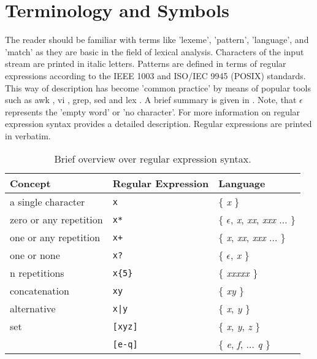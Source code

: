 \documentclass[acmtoplas]{acmtrans2m}
\begin{document}
\section{Terminology and Symbols}

The reader should be familiar with terms like 'lexeme', 'pattern', 'language',
    and 'match' as they are basic in the field of lexical analysis.  Characters
    of the input stream are printed in italic letters.  Patterns are defined in
    terms of regular expressions according to the IEEE 1003 and ISO/IEC 9945
    (POSIX) \cite{} standards.  This way of description has become 'common
    practice' by means of popular tools such as awk \cite{Aho:1988}, vi
    \cite{Lamb:1998}, grep, sed \cite{Dougherty:1997} and lex \cite{Lesk:1975}.
    A brief summary is given in .  Note, that
    $\epsilon$ represents the 'empty word' or 'no character'.  For more
    information on regular expression syntax \cite{Friedl:2006} provides a
    detailed description. Regular expressions are printed in verbatim.

\begin{table}
\caption{Brief overview over regular expression syntax.}
\label{tab:regular-expressions}
\begin{center}
\begin{tabular}{lll}
\bf Concept            & \bf Regular Expression & \bf Language \\ \hline \hline
a single character     & \tt x       & $\{$ {\it x} $\}$ \\
zero or any repetition & \tt x*      & $\{$ $\epsilon$, {\it x}, {\it xx}, {\it xxx} $\ldots$ $\}$ \\
one or any repetition  & \tt x+      & $\{$ {\it x}, {\it xx}, {\it xxx} $\ldots$ $\}$ \\
one or none            & \tt x?      & $\{$ $\epsilon$, {\it x} $\}$ \\
n repetitions          & \verb|x{5}| & $\{$ \it xxxxx $\}$ \\
concatenation          & \tt xy      & $\{$ {\it xy} $\}$ \\
alternative            & \tt x|y     & $\{$ {\it x}, {\it y} $\}$ \\ 
set                    & \verb|[xyz]| & $\{$ {\it x}, {\it y}, {\it z} $\}$ \\ 
                       & \verb|[e-q]| & $\{$ {\it e}, {\it f}, $\ldots$ {\it q} $\}$ \\ \hline
\end{tabular}
\end{center}
\end{table}
\end{document}
